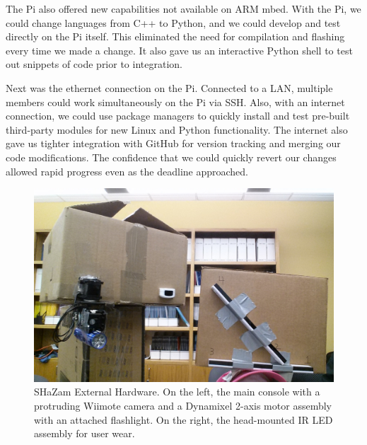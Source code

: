 \documentclass[conference, twocolumn]{IEEEtran}
\begin{document}
The Pi also offered new capabilities not available on ARM mbed. With the Pi, we could change languages from C++ to Python, and we could develop and test directly on the Pi itself. This eliminated the need for compilation and flashing every time we made a change. It also gave us an interactive Python shell to test out snippets of code prior to integration.

Next was the ethernet connection on the Pi. Connected to a LAN, multiple members could work simultaneously on the Pi via SSH. Also, with an internet connection, we could use package managers to quickly install and test pre-built third-party modules for new Linux and Python functionality. The internet also gave us tighter integration with GitHub for version tracking and merging our code modifications. The confidence that we could quickly revert our changes allowed rapid progress even as the deadline approached.

\begin{figure}[!t]
\begin{center}
\includegraphics[width=\linewidth]{../images/shazam_outer2}
\end{center}

\caption{SHaZam External Hardware. On the left, the main console with a protruding Wiimote camera and a Dynamixel 2-axis motor assembly with an attached flashlight. On the right, the head-mounted IR LED assembly for user wear.}
\label{fig:hw_mk0}
\end{figure}
\end{document}
